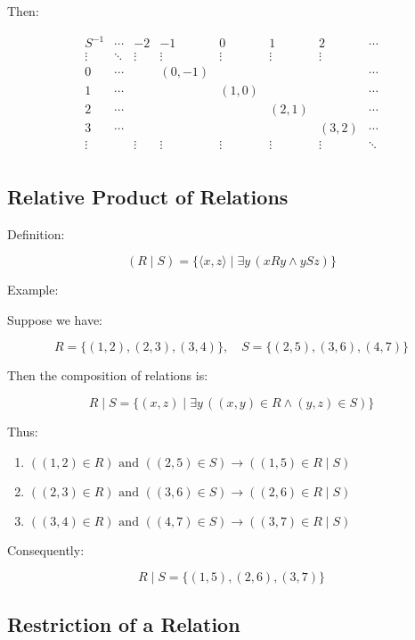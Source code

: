 \documentclass[12pt,a4paper,openany]{article}
\begin{document}
Then:

$$
\begin{array}{c|ccccccc}
S^{-1} & \cdots & -2 & -1 & 0 & 1 & 2 & \cdots \\
\hline
\vdots & \ddots & \vdots & \vdots & \vdots & \vdots & \vdots & \\
0 & \cdots & & (0,-1) & & & & \cdots \\
1 & \cdots & & & (1,0) & & & \cdots \\
2 & \cdots & & & & (2,1) & & \cdots \\
3 & \cdots & & & & & (3,2) & \cdots \\
\vdots & & \vdots & \vdots & \vdots & \vdots & \vdots & \ddots \\
\end{array}
$$

\subsection{Relative Product of Relations}

Definition:

$$
(R \mid S) = \{ \langle x, z \rangle \mid \exists y \, (xRy \wedge ySz) \}
$$

Example:

Suppose we have:  

$$
R = \{ (1, 2), (2, 3), (3, 4) \}, \quad
S = \{ (2, 5), (3, 6), (4, 7) \}
$$

Then the composition of relations is:

$$
R \mid S = \{ (x, z) \mid \exists y \, ((x, y) \in R \wedge (y, z) \in S) \}
$$

Thus:

\begin{enumerate}
\item $((1, 2) \in R) \text{ and } ((2, 5) \in S) \to ((1, 5) \in R \mid S)$ 
\item $((2, 3) \in R) \text{ and } ((3, 6) \in S) \to ((2, 6) \in R \mid S)$  
\item $((3, 4) \in R) \text{ and } ((4, 7) \in S) \to ((3, 7) \in R \mid S)$
\end{enumerate}

Consequently:

$$
R \mid S = \{ (1, 5), (2, 6), (3, 7) \}
$$

\subsection{Restriction of a Relation}
\end{document}
